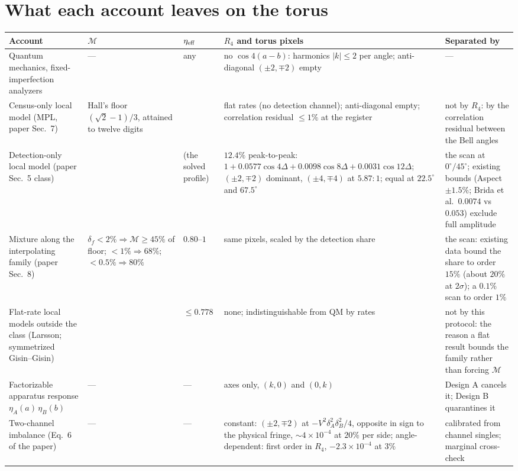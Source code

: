 \documentclass[10pt]{article}
\begin{document}
\section*{What each account leaves on the torus}
\begin{table}[H]
\footnotesize
\setlength{\tabcolsep}{4pt}\renewcommand{\arraystretch}{1.15}
\begin{tabular}{@{}>{\raggedright\arraybackslash}p{}>{\raggedright\arraybackslash}p{}>{\raggedright\arraybackslash}p{}>{\raggedright\arraybackslash}p{}>{\raggedright\arraybackslash}p{}@{}}
\toprule
Account & $\mathcal{M}$ & $\eta_{\rm eff}$ & $R_4$ and torus pixels & Separated by\\
\midrule
Quantum mechanics, fixed-imperfection analyzers & --- & any & no $\cos 4(a-b)$: harmonics $|k|\le 2$ per angle; anti-diagonal $(\pm2,\mp2)$ empty & ---\\
Census-only local model (MPL, paper Sec.~7) & Hall's floor $(\sqrt2-1)/3$, attained to twelve digits & 1 & flat rates (no detection channel); anti-diagonal empty; correlation residual $\le 1\%$ at the register & not by $R_4$: by the correlation residual between the Bell angles\\
Detection-only local model (paper Sec.~5 class) & 0 & 0.80 (the solved profile) & $12.4\%$ peak-to-peak: $1+0.0577\cos4\Delta+0.0098\cos8\Delta+0.0031\cos12\Delta$; $(\pm2,\mp2)$ dominant, $(\pm4,\mp4)$ at $5.87{:}1$; equal at $22.5^\circ$ and $67.5^\circ$ & the scan at $0^\circ/45^\circ$; existing bounds (Aspect $\pm1.5\%$; Brida et al.\ $0.0074$ vs $0.053$) exclude full amplitude\\
Mixture along the interpolating family (paper Sec.~8) & $\delta_f<2\%\Rightarrow\mathcal{M}\ge45\%$ of floor; $<1\%\Rightarrow 68\%$; $<0.5\%\Rightarrow 80\%$ & $0.80$--$1$ & same pixels, scaled by the detection share & the scan: existing data bound the share to order $15\%$ (about $20\%$ at $2\sigma$); a $0.1\%$ scan to order $1\%$\\
Flat-rate local models outside the class (Larsson; symmetrized Gisin--Gisin) & 0 & $\le 0.778$ & none; indistinguishable from QM by rates & not by this protocol: the reason a flat result bounds the family rather than forcing $\mathcal{M}$\\
\midrule
Factorizable apparatus response $\eta_A(a)\,\eta_B(b)$ & --- & --- & axes only, $(k,0)$ and $(0,k)$ & Design A cancels it; Design B quarantines it\\
Two-channel imbalance (Eq.~6 of the paper) & --- & --- & constant: $(\pm2,\mp2)$ at $-V^2\delta_A^2\delta_B^2/4$, opposite in sign to the physical fringe, $\sim4\times10^{-4}$ at $20\%$ per side; angle-dependent: first order in $R_4$, $-2.3\times10^{-4}$ at $3\%$ & calibrated from channel singles; marginal cross-check\\

\end{tabular}
\end{table}
\end{document}
